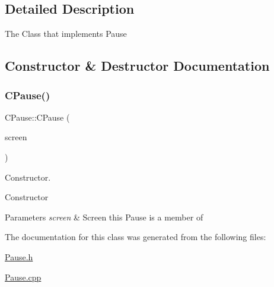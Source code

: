 \subsection{Detailed Description}
The Class that implements Pause 

\subsection{Constructor \& Destructor Documentation}
\mbox{\label{class_c_pause_af2fd743348426c540c4bb284865b63c4}} 
\subsubsection{\texorpdfstring{CPause()}{CPause()}}
{\footnotesize\ttfamily C\+Pause\+::\+C\+Pause (\begin{DoxyParamCaption}\item[{\mbox{\hyperlink{class_c_screen}{C\+Screen}} $\ast$}]{screen }\end{DoxyParamCaption})}



Constructor. 

Constructor 
\begin{DoxyParams}{Parameters}
{\em screen} & Screen this Pause is a member of \\
\hline
\end{DoxyParams}


The documentation for this class was generated from the following files\+:\begin{DoxyCompactItemize}
\item 
\mbox{\hyperlink{_pause_8h}{Pause.\+h}}\item 
\mbox{\hyperlink{_pause_8cpp}{Pause.\+cpp}}\end{DoxyCompactItemize}
